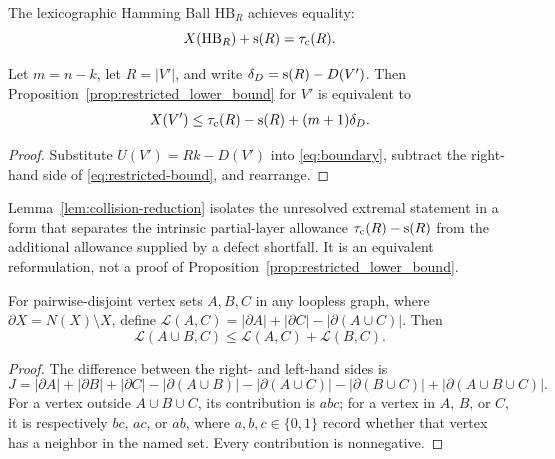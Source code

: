 \begin{theorem}\label{prop:hb-eval}
	The lexicographic Hamming Ball $\mathrm{HB}_R$ achieves equality:
	\begin{equation}\label{eq:hb-eval}
		X(\mathrm{HB}_R) + \mathrm{s}(R) = \tau_{\mathrm{c}}(R).
	\end{equation}
\end{theorem}

\begin{lemma}\label{lem:collision-reduction}
Let $m=n-k$, let $R=|V'|$, and write
$\delta_D=\mathrm{s}(R)-D(V')$. Then Proposition~\ref{prop:restricted_lower_bound} for $V'$
is equivalent to
\begin{equation}\label{eq:deficit-compensated-collision}
X(V') \leq \tau_{\mathrm{c}}(R)-\mathrm{s}(R)+(m+1)\delta_D.
\end{equation}
\end{lemma}

\begin{proof}
Substitute $U(V')=Rk-D(V')$ into \eqref{eq:boundary}, subtract the
right-hand side of \eqref{eq:restricted-bound}, and rearrange.
\end{proof}

Lemma~\ref{lem:collision-reduction} isolates the unresolved extremal
statement in a form that separates the intrinsic partial-layer allowance
$\tau_{\mathrm{c}}(R)-\mathrm{s}(R)$ from the additional allowance supplied by a defect
shortfall. It is an equivalent reformulation, not a proof of
Proposition~\ref{prop:restricted_lower_bound}.

\begin{lemma}\label{lem:interface-subadditivity}
For pairwise-disjoint vertex sets $A,B,C$ in any loopless graph, where
$\partial X=N(X)\setminus X$, define
$\mathcal{L}(A,C)=|\partial A|+|\partial C|-|\partial(A\cup C)|$. Then
\[\mathcal{L}(A\cup B,C)\leq\mathcal{L}(A,C)+\mathcal{L}(B,C).\]
\end{lemma}

\begin{proof}
The difference between the right- and left-hand sides is
\[
J=|\partial A|+|\partial B|+|\partial C|-|\partial(A\cup B)|
-|\partial(A\cup C)|-|\partial(B\cup C)|+|\partial(A\cup B\cup C)|.
\]
For a vertex outside $A\cup B\cup C$, its contribution is $abc$; for a
vertex in $A$, $B$, or $C$, it is respectively $bc$, $ac$, or $ab$, where
$a,b,c\in\{0,1\}$ record whether that vertex has a neighbor in the named
set. Every contribution is nonnegative.
\end{proof}

